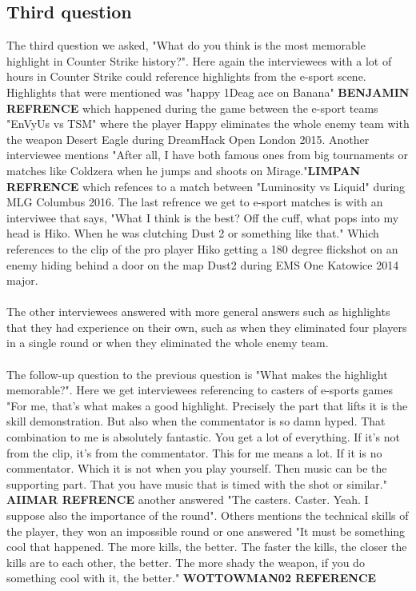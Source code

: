 \documentclass[a4paper,twoside]{bth}
\begin{document}
\subsection{Third question}
The third question we asked, "What do you think is the most memorable highlight in Counter Strike history?". Here again the interviewees with a lot of hours in Counter Strike could reference highlights from the e-sport scene. Highlights that were mentioned was "happy 1Deag ace on Banana" \textbf{BENJAMIN REFRENCE} which happened during the game between the e-sport teams "EnVyUs vs TSM" where the player Happy eliminates the whole enemy team with the weapon Desert Eagle during DreamHack Open London 2015. Another interviewee mentions "After all, I have both famous ones from big tournaments or matches like Coldzera when he jumps and shoots on Mirage."\textbf{LIMPAN REFRENCE} which refences to a match between "Luminosity vs Liquid" during MLG Columbus 2016. The last refrence we get to e-sport matches is with an interviwee that says, "What I think is the best? Off the cuff, what pops into my head is Hiko. When he was clutching Dust 2 or something like that." Which references to the clip of the pro player Hiko getting a 180 degree flickshot on an enemy hiding behind a door on the map Dust2 during EMS One Katowice 2014 major.\\\\
The other interviewees answered with more general answers such as highlights that they had experience on their own, such as when they eliminated four players in a single round or when they eliminated the whole enemy team.\\\\
The follow-up question to the previous question is "What makes the highlight memorable?". Here we get interviewees referencing to casters of e-sports games "For me, that's what makes a good highlight. Precisely the part that lifts it is the skill demonstration. But also when the commentator is so damn hyped. That combination to me is absolutely fantastic. You get a lot of everything. If it's not from the clip, it's from the commentator. This for me means a lot. If it is no commentator. Which it is not when you play yourself. Then music can be the supporting part. That you have music that is timed with the shot or similar." \textbf{AIIMAR REFRENCE} another answered "The casters. Caster. Yeah. I suppose also the importance of the round". Others mentions the technical skills of the player, they won an impossible round or one answered "It must be something cool that happened. The more kills, the better. The faster the kills, the closer the kills are to each other, the better. The more shady the weapon, if you do something cool with it, the better." \textbf{WOTTOWMAN02 REFERENCE}\\\\
\end{document}
